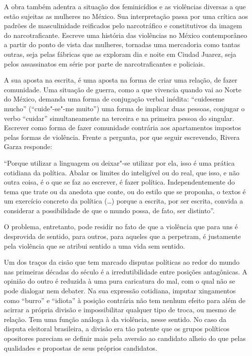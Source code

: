 A obra também adentra a situação dos feminicídios e as violências
diversas a que estão sujeitas as mulheres no México. Sua interpretação
passa por uma crítica aos padrões de masculinidade reificados pelo
narcotráfico e constitutivos da imagem do narcotraficante. Escreve uma
história das violências no México contemporâneo a partir do ponto de
vista das mulheres, tornadas uma mercadoria como tantas outras, seja
pelas fábricas que as exploram dia e noite em Ciudad Juarez, seja pelos
assassinatos em série por parte de narcotraficantes e policiais.

A sua aposta na escrita, é uma aposta na forma de criar uma relação, de
fazer comunidade. Uma situação de guerra, como a que vivencia quando vai
ao Norte do México, demanda uma forma de conjugação verbal inédita:
``cuideseme mucho'' (``cuide"-se"-me muito'') uma forma de implicar duas
pessoas, conjugar o verbo ``cuidar'' simultaneamente na terceira e na
primeira pessoa do singular. Escrever como forma de fazer comunidade
contrária aos apartamentos impostos pelas formas de violência. Frente a
pergunta, por que seguir escrevendo, Rivera Garza responde:

``Porque utilizar a linguagem ou deixar"-se utilizar por ela, isso é uma
prática cotidiana da política. Abalar os limites do inteligível ou do
real, que isso, e não outra coisa, é o que se faz ao escrever, é fazer
política. Independentemente do tema que trate ou da anedota que conte,
ou do estilo que se proponha, o textos é um exercício concreto da
política (\ldots{}) porque a escrita, por ser escrita, convida a considerar a
possibilidade de que o mundo possa, de fato, ser distinto''.

O problema, entretanto, pode residir no fato de que a violência que para
uns é desprovida de sentido, para outros, para aqueles que a perpetram,
é justamente pela violência que se atribui sentido a uma vida sem
sentido.

\asterisc

Um dos traços da cisão que tem marcado disputas políticas ao redor do
mundo nas primeiras décadas do século  é a irredutibilidade entre
posições antagônicas. A opinião do outro é reduzida à uma pura
caricatura do mal, com o qual não se pode dialogar nem debater. Na sua
expressão cotidiana, imputar xingamentos como ``burro'' e ``idiota'' à
posição contrária não tem nenhum efeito para além de acirrar a própria
divisão e impossibilitar qualquer tipo de troca, ou mesmo de relação.
Tem uma função análoga à da violência, nesse sentido. No caso da disputa
eleitoral brasileira, a divisão era tão patente que os grupos políticos
opositores pareciam se definir mais pela aversão ao candidato alheio do
que pelas qualidades e propostas de seus próprios candidatos.

